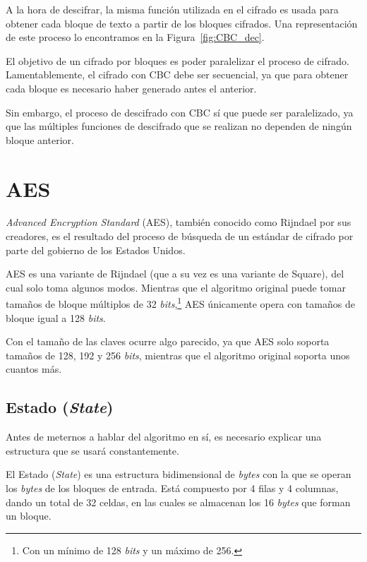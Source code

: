 A la hora de descifrar, la misma función utilizada en el cifrado es usada para obtener cada bloque de texto a partir de los bloques cifrados. Una representación de este proceso lo encontramos en la Figura~\ref{fig:CBC_dec}.

El objetivo de un cifrado por bloques es poder paralelizar el proceso de cifrado. Lamentablemente, el cifrado con CBC debe ser secuencial, ya que para obtener cada bloque es necesario haber generado antes el anterior.

Sin embargo, el proceso de descifrado con CBC sí que puede ser paralelizado, ya que las múltiples funciones de descifrado que se realizan no dependen de ningún bloque anterior. \emph{\parencite{Reference24}}


\section{AES}

\label{AES}

\emph{Advanced Encryption Standard} (AES), también conocido como Rijndael por sus creadores, es el resultado del proceso de búsqueda de un estándar de cifrado por parte del gobierno de los Estados Unidos.

AES es una variante de Rijndael (que a su vez es una variante de Square), del cual solo toma algunos modos. Mientras que el algoritmo original puede tomar tamaños de bloque múltiplos de 32 \emph{bits},\footnote{Con un mínimo de 128 \emph{bits} y un máximo de 256.} AES únicamente opera con tamaños de bloque igual a 128 \emph{bits}.

Con el tamaño de las claves ocurre algo parecido, ya que AES solo soporta tamaños de 128, 192 y 256 \emph{bits}, mientras que el algoritmo original soporta unos cuantos más. \emph{\parencite{Reference25}}

\subsection{Estado (\emph{State})}

Antes de meternos a hablar del algoritmo en sí, es necesario explicar una estructura que se usará constantemente.

El Estado (\emph{State}) es una estructura bidimensional de \emph{bytes} con la que se operan los \emph{bytes} de los bloques de entrada. Está compuesto por 4 filas y 4 columnas, dando un total de 32 celdas, en las cuales se almacenan los 16 \emph{bytes} que forman un bloque. \emph{\parencite{Reference26}}

